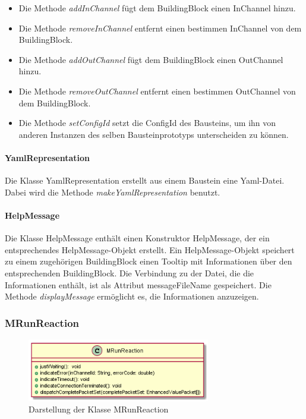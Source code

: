 \documentclass[parskip=full]{scrartcl}
\begin{document}
\begin{itemize}

\item Die Methode \textit{addInChannel} fügt dem BuildingBlock einen InChannel hinzu.
\item Die Methode \textit{removeInChannel} entfernt einen bestimmen InChannel von dem BuildingBlock.
\item Die Methode \textit{addOutChannel} fügt dem BuildingBlock einen OutChannel hinzu.
\item Die Methode \textit{removeOutChannel} entfernt einen bestimmen OutChannel von dem BuildingBlock.
\item Die Methode \textit{setConfigId} setzt die ConfigId des Bausteins, um ihn von anderen Instanzen des selben Bausteinprototyps unterscheiden zu können. 
\end{itemize}





\paragraph{YamlRepresentation}

Die Klasse YamlRepresentation erstellt aus einem Baustein eine Yaml-Datei. Dabei wird die Methode \textit{makeYamlRepresentation} benutzt.


\paragraph{HelpMessage}
Die Klasse HelpMessage enthält einen Konstruktor HelpMessage, der ein entsprechendes HelpMessage-Objekt erstellt.
Ein HelpMessage-Objekt speichert zu einem zugehörigen BuildingBlock einen Tooltip mit Informationen über den entsprechenden BuildingBlock. Die Verbindung zu der Datei, die die Informationen enthält, ist als Attribut messageFileName gespeichert. Die Methode
\textit{displayMessage} ermöglicht es, die Informationen anzuzeigen.



\subsubsection{MRunReaction}

\begin{figure}[htbp]
	\begin{center}
		\includegraphics[width = 8cm]{Grafiken/MRunReaction.png}
		\caption{Darstellung der Klasse MRunReaction}
		\label{MRunReaction}
	\end{center}
\end{figure}
\end{document}
